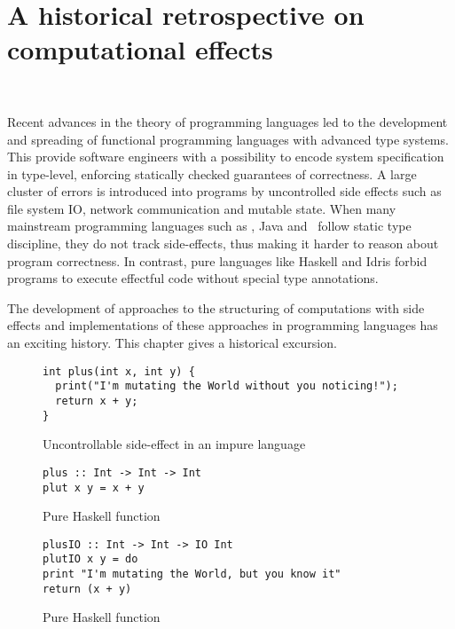 \chapter{A historical retrospective on computational effects}
~\label{cpt-effects}

Recent advances in the theory of programming languages led to the development and spreading
of functional programming languages with advanced type systems. This provide
software engineers with a possibility to encode system specification in type-level, enforcing
statically checked guarantees of correctness. A large cluster of errors is
introduced into programs by uncontrolled side effects such as file system IO,
network communication and mutable state. When many mainstream programming languages such as \cpp,
Java and \cs~follow static type discipline, they do not track
side-effects, thus making it harder to reason about program correctness. In contrast,
pure languages like Haskell and Idris forbid programs to execute effectful code
without special type annotations.

The development of approaches to the structuring of computations with side effects
and implementations of these approaches in programming languages has an exciting
history. This chapter gives a historical excursion.

\begin{figure}[h]
\begin {lstlisting}
int plus(int x, int y) {
  print("I'm mutating the World without you noticing!");
  return x + y;
}
\end{lstlisting}
\caption{Uncontrollable side-effect in an impure language}
\label{listing:effectfulPlus}
\end{figure}

\begin{figure}[h]
\begin{lstlisting}
plus :: Int -> Int -> Int
plut x y = x + y
\end{lstlisting}
\caption{Pure Haskell function}
\label{listing:purePlusHaskell}
\end{figure}

\begin{figure}[h]
\begin{lstlisting}
plusIO :: Int -> Int -> IO Int
plutIO x y = do
print "I'm mutating the World, but you know it"
return (x + y)
\end{lstlisting}
\caption{Pure Haskell function}
\label{listing:purePlusHaskell}
\end{figure}

